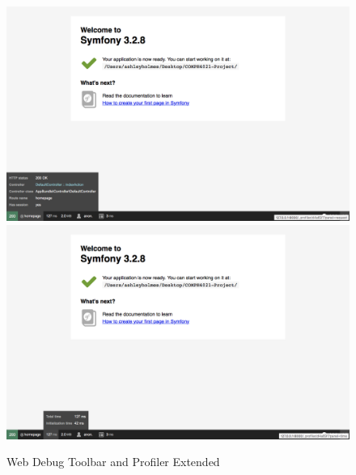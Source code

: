 \begin{figure}[htbp]
   \centering
   \includegraphics[width=400pt]{figures/webdebug_1.png}
   \includegraphics[width=400pt]{figures/webdebug_2.png} %
   \caption{Web Debug Toolbar and Profiler Extended}
   \label{fig:Web Debug Toolbar and Profiler Extended}
\end{figure}

